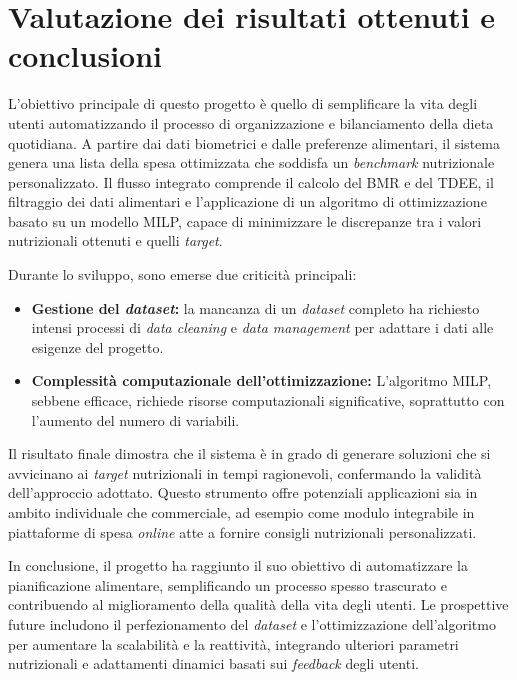 \documentclass[11pt,a4paper]{article}
\begin{document}


\section{Valutazione dei risultati ottenuti e conclusioni}

L’obiettivo principale di questo progetto è quello di semplificare la vita degli utenti automatizzando il processo di organizzazione e bilanciamento della dieta quotidiana. A partire dai dati biometrici e dalle preferenze alimentari, il sistema genera una lista della spesa ottimizzata che soddisfa un \textit{benchmark} nutrizionale personalizzato. Il flusso integrato comprende il calcolo del BMR e del TDEE, il filtraggio dei dati alimentari e l’applicazione di un algoritmo di ottimizzazione basato su un modello MILP, capace di minimizzare le discrepanze tra i valori nutrizionali ottenuti e quelli \textit{target}.

Durante lo sviluppo, sono emerse due criticità principali:
\begin{itemize}
    \item \textbf{Gestione del \textit{dataset}:} la mancanza di un \textit{dataset} completo ha richiesto intensi processi di \textit{data cleaning} e \textit{data management} per adattare i dati alle esigenze del progetto.
    \item \textbf{Complessità computazionale dell’ottimizzazione:} L’algoritmo MILP, sebbene efficace, richiede risorse computazionali significative, soprattutto con l’aumento del numero di variabili.
\end{itemize}

Il risultato finale dimostra che il sistema è in grado di generare soluzioni che si avvicinano ai \textit{target} nutrizionali in tempi ragionevoli, confermando la validità dell'approccio adottato. Questo strumento offre potenziali applicazioni sia in ambito individuale che commerciale, ad esempio come modulo integrabile in piattaforme di spesa \textit{online} atte a fornire consigli nutrizionali personalizzati.

\bigskip

In conclusione, il progetto ha raggiunto il suo obiettivo di automatizzare la pianificazione alimentare, semplificando un processo spesso trascurato e contribuendo al miglioramento della qualità della vita degli utenti. Le prospettive future includono il perfezionamento del \textit{dataset} e l’ottimizzazione dell'algoritmo per aumentare la scalabilità e la reattività, integrando ulteriori parametri nutrizionali e adattamenti dinamici basati sui \textit{feedback} degli utenti.
\end{document}
